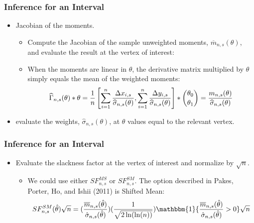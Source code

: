 \documentclass[10pt,letterpaper]{beamer}
\begin{document}
\begin{frame}
\frametitle{Inference for an Interval}

\begin{itemize}
\item Jacobian of the moments. 

\begin{itemize}
\item Compute the Jacobian of the sample unweighted moments, $\overline{m}%
_{n,s}(\theta)$, and evaluate the result at the vertex of interest: 

\item When the moments are linear in $\theta $, the derivative matrix
multiplied by $\theta $ simply equals the mean of the weighted moments:%
\begin{equation*}
\widehat{\Gamma }_{n,s}(\theta )\ast \theta =\frac{1}{n}\left[
\sum_{i=1}^{n}\frac{\Delta x_{i,s}}{\widehat{\sigma }_{n,s}(\theta )}%
,\sum_{i=1}^{n}\frac{\Delta y_{i,s}}{\widehat{\sigma }_{n,s}(\theta )%
}\right] \ast \binom{\theta _{0}}{\theta _{1}}=\frac{m_{n,s}(\theta )}{%
\widehat{\sigma }_{n,s}(\theta )}
\end{equation*}
\end{itemize}

\item evaluate the weights, $\widehat{\sigma }_{n,s}(\theta )$, at $\theta $
values equal to the relevant vertex.
\end{itemize}
\end{frame}


\begin{frame}
\frametitle{Inference for an Interval}

\begin{itemize}
\item Evaluate the slackness factor at the vertex of interest and normalize
by $\sqrt{n}$. 

\begin{itemize}
\item We could use either $SF_{n,s}^{MS}$ or $SF_{n,s}^{SM}$.\newline
The option described in Pakes, Porter, Ho, and Ishii (2011) is Shifted Mean: 
\begin{equation*}
SF_{n,s}^{SM}(\hat{\theta})\sqrt{n}=(\frac{\overline{m}_{n,s}(\hat{\theta})}{%
\hat{\sigma}_{n,s}(\hat{\theta})})(\frac{1}{\sqrt{2\ln (\ln (n))}})%
\mathbbm{1}\{\frac{\overline{m}_{n,s}(\hat{\theta})}{\hat{\sigma}_{n,s}(\hat{%
\theta})}>0\}\sqrt{n}
\end{equation*}
\end{itemize}
\end{itemize}
\end{frame}
\end{document}
